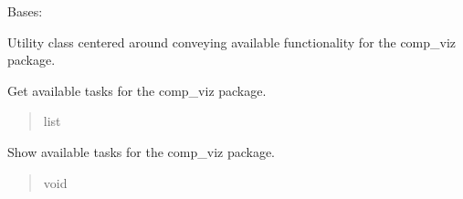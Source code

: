 \documentclass[letterpaper,10pt,english]{sphinxmanual}
\begin{document}
\begin{fulllineitems}
\label{\detokenize{comp_viz.utils:comp_viz.utils.toolbox.Models}}
\pysigstartsignatures
{}
\pysigstopsignatures
\sphinxAtStartPar
Bases: 

\sphinxAtStartPar
Utility class centered around conveying available functionality for the comp\_viz package.

\begin{fulllineitems}
\label{\detokenize{comp_viz.utils:comp_viz.utils.toolbox.Models.get_tasks}}
\pysigstartsignatures
{}
\pysigstopsignatures
\sphinxAtStartPar
Get available tasks for the comp\_viz package.
\begin{quote}\begin{description}
\sphinxAtStartPar
list

\end{description}\end{quote}

\end{fulllineitems}


\begin{fulllineitems}
\label{\detokenize{comp_viz.utils:comp_viz.utils.toolbox.Models.list_tasks}}
\pysigstartsignatures
{}
\pysigstopsignatures
\sphinxAtStartPar
Show available tasks for the comp\_viz package.
\begin{quote}\begin{description}
\sphinxAtStartPar
void

\end{description}\end{quote}

\end{fulllineitems}


\end{fulllineitems}

\end{document}
